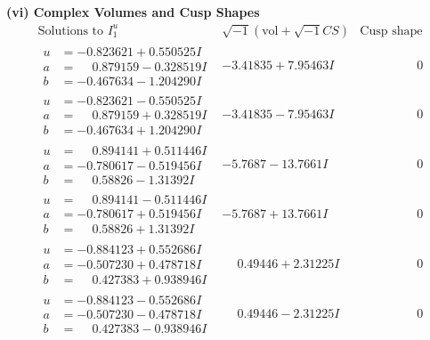 \documentclass[1p]{elsarticle_modified}
\theoremstyle{definition}
\newcommand{\I}{\sqrt{-1}}
\begin{document}
\newpage\flushleft \textbf{(vi) Complex Volumes and Cusp Shapes}
$$\begin{array}{c|c|c}  
\text{Solutions to }I^u_{1}& \I (\text{vol} + \sqrt{-1}CS) & \text{Cusp shape}\\
 \hline 
\begin{aligned}
u &= -0.823621 + 0.550525 I \\
a &= \phantom{-}0.879159 - 0.328519 I \\
b &= -0.467634 - 1.204290 I\end{aligned}
 & -3.41835 + 7.95463 I & \phantom{-0.000000 } 0 \\ \hline\begin{aligned}
u &= -0.823621 - 0.550525 I \\
a &= \phantom{-}0.879159 + 0.328519 I \\
b &= -0.467634 + 1.204290 I\end{aligned}
 & -3.41835 - 7.95463 I & \phantom{-0.000000 } 0 \\ \hline\begin{aligned}
u &= \phantom{-}0.894141 + 0.511446 I \\
a &= -0.780617 - 0.519456 I \\
b &= \phantom{-}0.58826 - 1.31392 I\end{aligned}
 & -5.7687 - 13.7661 I & \phantom{-0.000000 } 0 \\ \hline\begin{aligned}
u &= \phantom{-}0.894141 - 0.511446 I \\
a &= -0.780617 + 0.519456 I \\
b &= \phantom{-}0.58826 + 1.31392 I\end{aligned}
 & -5.7687 + 13.7661 I & \phantom{-0.000000 } 0 \\ \hline\begin{aligned}
u &= -0.884123 + 0.552686 I \\
a &= -0.507230 + 0.478718 I \\
b &= \phantom{-}0.427383 + 0.938946 I\end{aligned}
 & \phantom{-}0.49446 + 2.31225 I & \phantom{-0.000000 } 0 \\ \hline\begin{aligned}
u &= -0.884123 - 0.552686 I \\
a &= -0.507230 - 0.478718 I \\
b &= \phantom{-}0.427383 - 0.938946 I\end{aligned}
 & \phantom{-}0.49446 - 2.31225 I & \phantom{-0.000000 } 0 \\ \hline\begin{aligned}

\end{aligned}
\end{array}$$
\end{document}
